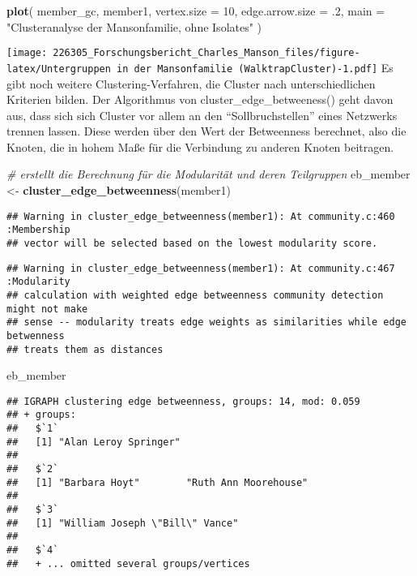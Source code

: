 \documentclass[
]{article}
\newenvironment{Shaded}{\begin{snugshade}}{\end{snugshade}}
\newcommand{\CommentTok}[1]{\textcolor[rgb]{0.56,0.35,0.01}{\textit{#1}}}
\newcommand{\DataTypeTok}[1]{\textcolor[rgb]{0.13,0.29,0.53}{#1}}
\newcommand{\DecValTok}[1]{\textcolor[rgb]{0.00,0.00,0.81}{#1}}
\newcommand{\FloatTok}[1]{\textcolor[rgb]{0.00,0.00,0.81}{#1}}
\newcommand{\KeywordTok}[1]{\textcolor[rgb]{0.13,0.29,0.53}{\textbf{#1}}}
\newcommand{\NormalTok}[1]{#1}
\newcommand{\StringTok}[1]{\textcolor[rgb]{0.31,0.60,0.02}{#1}}
\begin{document}
\begin{Shaded}
\begin{Highlighting}[]
\KeywordTok{plot}\NormalTok{(}
\NormalTok{  member_gc,}
\NormalTok{  member1,}
  \DataTypeTok{vertex.size =} \DecValTok{10}\NormalTok{,}
  \DataTypeTok{edge.arrow.size =} \FloatTok{.2}\NormalTok{,}
  \DataTypeTok{main =} \StringTok{"Clusteranalyse der Mansonfamilie, ohne Isolates"}
\NormalTok{)}
\end{Highlighting}
\end{Shaded}

\texttt{[image: 226305\_Forschungsbericht\_Charles\_Manson\_files/figure-latex/Untergruppen in der Mansonfamilie (WalktrapCluster)-1.pdf]}
Es gibt noch weitere Clustering-Verfahren, die Cluster nach
unterschiedlichen Kriterien bilden. Der Algorithmus von
cluster\_edge\_betweeness() geht davon aus, dass sich sich Cluster vor
allem an den ``Sollbruchstellen'' eines Netzwerks trennen lassen. Diese
werden über den Wert der Betweenness berechnet, also die Knoten, die in
hohem Maße für die Verbindung zu anderen Knoten beitragen.

\begin{Shaded}
\begin{Highlighting}[]
\CommentTok{# erstellt die Berechnung für die Modularität und deren Teilgruppen}
\NormalTok{eb_member <-}\StringTok{ }\KeywordTok{cluster_edge_betweenness}\NormalTok{(member1)}
\end{Highlighting}
\end{Shaded}

\begin{verbatim}
## Warning in cluster_edge_betweenness(member1): At community.c:460 :Membership
## vector will be selected based on the lowest modularity score.
\end{verbatim}

\begin{verbatim}
## Warning in cluster_edge_betweenness(member1): At community.c:467 :Modularity
## calculation with weighted edge betweenness community detection might not make
## sense -- modularity treats edge weights as similarities while edge betwenness
## treats them as distances
\end{verbatim}

\begin{Shaded}
\begin{Highlighting}[]
\NormalTok{eb_member}
\end{Highlighting}
\end{Shaded}

\begin{verbatim}
## IGRAPH clustering edge betweenness, groups: 14, mod: 0.059
## + groups:
##   $`1`
##   [1] "Alan Leroy Springer"
##   
##   $`2`
##   [1] "Barbara Hoyt"        "Ruth Ann Moorehouse"
##   
##   $`3`
##   [1] "William Joseph \"Bill\" Vance"
##   
##   $`4`
##   + ... omitted several groups/vertices
\end{verbatim}
\end{document}
